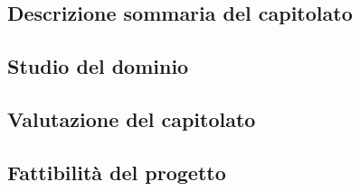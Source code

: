 \subsection{Descrizione sommaria del capitolato}

\subsection{Studio del dominio}

\subsection{Valutazione del capitolato}

\subsection{Fattibilità del progetto}

